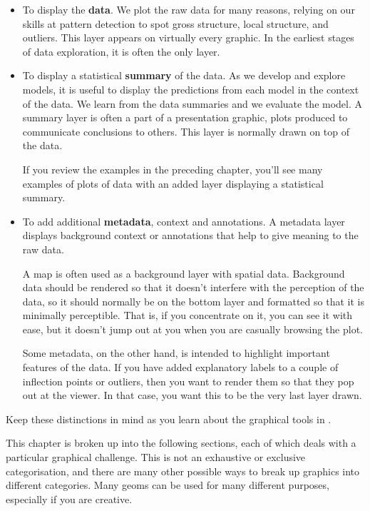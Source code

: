 \begin{itemize}
  \item To display the {\bf data}.  We plot the raw data for many reasons, relying on our skills at pattern detection to spot gross structure, local structure, and outliers.  This layer appears on virtually every graphic.  In the earliest stages of data exploration, it is often the only layer.

  \item To display a statistical {\bf summary} of the data. As we develop and explore models, it is useful to display the predictions from each model in the context of the data. We learn from the data summaries and we evaluate the model. A summary layer is often a part of a presentation graphic, plots produced to communicate conclusions to others. This layer is normally drawn on top of the data.

  If you review the examples in the preceding chapter, you'll see many examples of plots of data with an added layer displaying a statistical summary.

  \item To add additional {\bf metadata}, context and annotations. A metadata layer displays background context or annotations that help to give meaning to the raw data. 
  
  A map is often used as a background layer with spatial data. Background data should be rendered so that it doesn't interfere with the perception of the data, so it should normally be on the bottom layer and formatted so that it is minimally perceptible. That is, if you concentrate on it, you can see it with ease, but it doesn't jump out at you when you are casually browsing the plot.

  Some metadata, on the other hand, is intended to highlight important features of the data. If you have added explanatory labels to a couple of inflection points or outliers, then you want to render them so that they pop out at the viewer. In that case, you want this to be the very last layer drawn.

\end{itemize}

Keep these distinctions in mind as you learn about the graphical tools in \ggplot.  

This chapter is broken up into the following sections, each of which deals with a particular graphical challenge.  This is not an exhaustive or exclusive categorisation, and there are many other possible ways to break up graphics into different categories.  Many geoms can be used for many different purposes, especially if you are creative.

